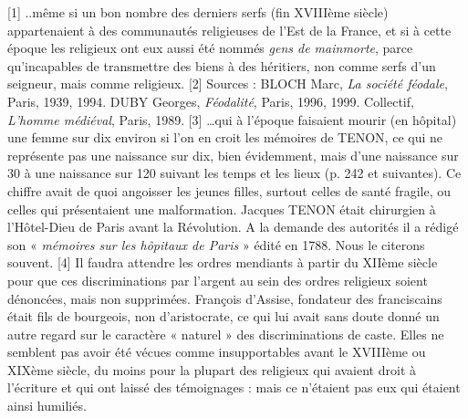 [1] ..même si un bon nombre des derniers serfs (fin XVIIIème siècle) appartenaient à des communautés religieuses de l'Est de la France, et si à cette époque les religieux ont eux aussi été nommés \emph{gens de mainmorte}, parce qu'incapables de transmettre des biens à des héritiers, non comme serfs d'un seigneur, mais comme religieux.
[2] Sources : BLOCH Marc, \emph{La société féodale}, Paris, 1939, 1994. DUBY Georges, \emph{Féodalité}, Paris, 1996, 1999. Collectif,\emph{ L'homme médiéval}, Paris, 1989. 
[3] …qui à l'époque faisaient mourir (en hôpital) une femme sur dix environ si l'on en croit les mémoires de TENON, ce qui ne représente pas une naissance sur dix, bien évidemment, mais d'une naissance sur 30 à une naissance sur 120 suivant les temps et les lieux (p. 242 et suivantes). Ce chiffre avait de quoi angoisser les jeunes filles, surtout celles de santé fragile, ou celles qui présentaient une malformation. Jacques TENON était chirurgien à l'Hôtel-Dieu de Paris avant la Révolution. A la demande des autorités il a rédigé son « \emph{mémoires sur les hôpitaux de Paris} » édité en 1788. Nous le citerons souvent. 
[4] Il faudra attendre les ordres mendiants à partir du XIIème siècle pour que ces discriminations par l'argent au sein des ordres religieux soient dénoncées, mais non supprimées. François d'Assise, fondateur des franciscains était fils de bourgeois, non d'aristocrate, ce qui lui avait sans doute donné un autre regard sur le caractère « naturel » des discriminations de caste. Elles ne semblent pas avoir été vécues comme insupportables avant le XVIIIème ou XIXème siècle, du moins pour la plupart des religieux qui avaient droit à l'écriture et qui ont laissé des témoignages : mais ce n'étaient pas eux qui étaient ainsi humiliés.